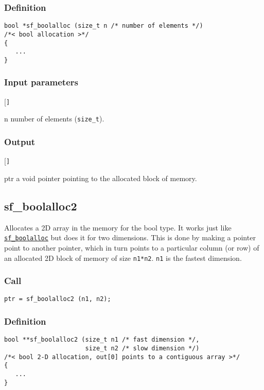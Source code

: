 \subsubsection*{Definition}
\begin{verbatim}
bool *sf_boolalloc (size_t n /* number of elements */)
/*< bool allocation >*/
{
   ...
}
\end{verbatim}

\subsubsection*{Input parameters}
\begin{desclist}{\tt }{\quad}[\tt ]
   \setlength\itemsep{0pt}
   \item[n] number of elements (\texttt{size\_t}).
\end{desclist}

\subsubsection*{Output}
\begin{desclist}{\tt }{\quad}[\tt ]
   \setlength\itemsep{0pt}
   \item[ptr] a void pointer pointing to the allocated block of memory.
\end{desclist}




\subsection{{sf\_boolalloc2}}\label{sec:sf_boolalloc2}
Allocates a 2D array in the memory for the bool type. It works just like \hyperref[sec:sf_boolalloc]{\texttt{sf\_boolalloc}} but does it for two dimensions. This is done by making a pointer point to another pointer, which in turn points to a particular column (or row) of an allocated 2D block of memory of size \texttt{n1*n2}. \texttt{n1} is the fastest dimension.

\subsubsection*{Call}
\begin{verbatim}ptr = sf_boolalloc2 (n1, n2);\end{verbatim}

\subsubsection*{Definition}
\begin{verbatim}
bool **sf_boolalloc2 (size_t n1 /* fast dimension */, 
                      size_t n2 /* slow dimension */)
/*< bool 2-D allocation, out[0] points to a contiguous array >*/
{
   ...
}
\end{verbatim}

